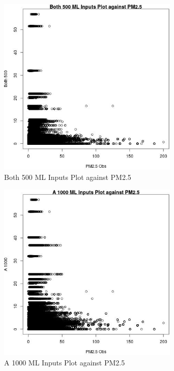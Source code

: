 \begin{figure} 
\centering  
\includegraphics[width=0.77\textwidth]{Code_Outputs/ML_input_report_ML_input_PM25_Step5_part_d_de_duplicated_aves_ML_input_Both_500vPM25_Obs.jpg} 
\caption{\label{fig:ML_input_report_ML_input_PM25_Step5_part_d_de_duplicated_aves_ML_inputBoth_500vPM25_Obs}Both 500 ML Inputs Plot against PM2.5} 
\end{figure} 
 

\begin{figure} 
\centering  
\includegraphics[width=0.77\textwidth]{Code_Outputs/ML_input_report_ML_input_PM25_Step5_part_d_de_duplicated_aves_ML_input_A_1000vPM25_Obs.jpg} 
\caption{\label{fig:ML_input_report_ML_input_PM25_Step5_part_d_de_duplicated_aves_ML_inputA_1000vPM25_Obs}A 1000 ML Inputs Plot against PM2.5} 
\end{figure} 
 

